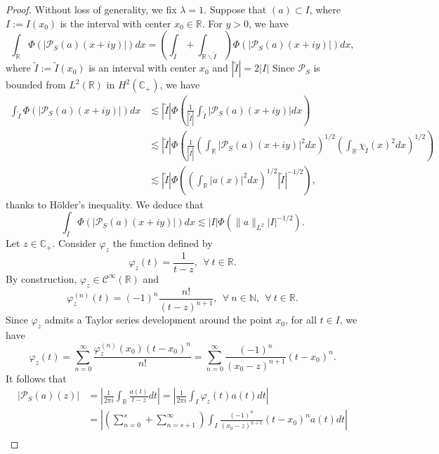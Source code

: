 \documentclass[a4paper,12pt,intlimits,oneside]{amsart}
\theoremstyle{definition}
\numberwithin{equation}{section}
\theoremstyle{definition}
\begin{document}
\begin{proof} 
Without loss of generality, we fix $\lambda=1$.
Suppose that  $(a)\subset I$, where $I:=I(x_{0})$ is the interval with center $x_{0} \in \mathbb{R}$. For $y>0$, we have
 $$  \int_{\mathbb{R}}\Phi( |\mathcal{P}_{S}(a)(x+iy)|)dx = \left(\int_{\widetilde{I}}+\int_{\mathbb{R}\backslash \widetilde{I}}\right)\Phi( |\mathcal{P}_{S}(a)(x+iy)|)dx,    $$
where $\widetilde{I}:=\widetilde{I}(x_{0})$ is an interval with center $x_{0}$ and  $|\widetilde{I}|= 2|I|$
Since  $\mathcal{P}_{S}$ is bounded from  $L^{2}(\mathbb{R})$ in  $H^{2}(\mathbb{C}_{+})$, we have
\begin{align*}
\int_{\widetilde{I}}\Phi( |\mathcal{P}_{S}(a)(x+iy)|)dx 
&\lesssim |\widetilde{I}|\Phi\left( \frac{1}{|\widetilde{I}|}\int_{\widetilde{I}} |\mathcal{P}_{S}(a)(x+iy)|dx \right) \\
&\lesssim |\widetilde{I}|\Phi\left( \frac{1}{|\widetilde{I}|}\left(\int_{\mathbb{R}} |\mathcal{P}_{S}(a)(x+iy)|^{2}dx\right)^{1/2}\left( \int_{\mathbb{R}}\chi_{\widetilde{I}}(x)^{2}dx\right)^{1/2} \right) \\
&\lesssim |\widetilde{I}|\Phi\left( \left(\int_{\mathbb{R}} |a(x)|^{2}dx\right)^{1/2}|\widetilde{I}|^{-1/2} \right), \end{align*}
thanks to   H\"older's inequality.  We deduce that
\begin{equation}\label{eq:dta2}
\int_{\widetilde{I}}\Phi( |\mathcal{P}_{S}(a)(x+iy)|)dx \lesssim |I|\Phi\left( \| a\|_{L^{2}}|I|^{-1/2}  \right).
\end{equation}
Let $z \in \mathbb{C}_{+}$. Consider $\varphi_{z}$ the function defined by
$$ \varphi_{z}(t) = \frac{1}{t-z},~~\forall~t\in \mathbb{R}.  $$
By construction, $\varphi_{z} \in \mathscr{C}^{\infty}(\mathbb{R})$ and 
$$ \varphi_{z}^{(n)}(t) = (-1)^{n}\frac{n!}{(t-z)^{n+1}},~~\forall~n \in \mathbb{N},~~\forall~t\in \mathbb{R}.  $$
Since $\varphi_{z}$ admits a Taylor series development around the point $x_{0}$, for all $t\in I$, we have
$$  \varphi_{z}(t)= \sum_{n=0}^{\infty}\frac{\varphi_{z}^{(n)}(x_{0})(t-x_{0})^{n}}{n!} 
= \sum_{n=0}^{\infty} \frac{(-1)^{n}}{(x_{0}-z)^{n+1}}(t-x_{0})^{n}.
   $$
It follows that
\begin{align*}
|\mathcal{P}_{S}(a)(z)| &= \left|\frac{1}{2\pi i} \int_{\mathbb{R}}\frac{a(t)}{t-z}dt    \right|  = \left| \frac{1}{2\pi i}\int_{I} \varphi_{z}(t)a(t)dt    \right| \\
&=\left|\left(\sum_{n=0}^{s}+ \sum_{n=s+1}^{\infty} \right) \int_{I}\frac{(-1)^{n}}{(x_{0}-z)^{n+1}}(t-x_{0})^{n} a(t)dt    \right| \\

\end{align*}
\end{proof}
\end{document}
